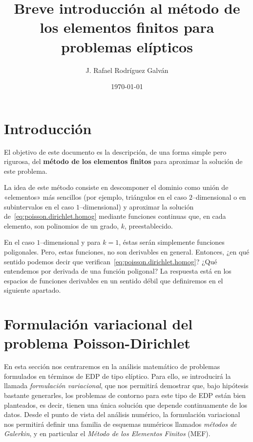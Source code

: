 \documentclass[11pt]{report}
\title{Breve introducción al método de los elementos finitos para problemas elípticos}
\author{J. Rafael Rodríguez Galván}
\date{\versiondate\today}
\theoremstyle{plain}
\theoremstyle{definition}
\begin{document}
\maketitle

\chapter{Introducción}

El objetivo de este documento es la descripción,  de una forma simple pero rigurosa, del \textbf{método de los elementos finitos} para aproximar la solución de este problema.

La idea de este método consiste en descomponer el dominio como unión de «elementos» más sencillos (por ejemplo, triángulos en el caso $2$--dimensional o en subintervalos en el caso $1$--dimensional) y aproximar la solución de~\eqref{eq:poisson.dirichlet.homog} mediante funciones continuas que, en cada elemento, son polinomios de un grado, $k$, preestablecido.

En el caso $1$--dimensional y para $k=1$, éstas serán simplemente funciones poligonales. Pero, estas funciones, no son derivables en general. Entonces, ¿en qué sentido podemos decir que verifican~\eqref{eq:poisson.dirichlet.homog}? ¿Qué entendemos por derivada de una función poligonal? La respuesta está en los espacios de funciones derivables en un sentido débil que definiremos en el siguiente apartado.


\chapter{Formulación variacional del problema Poisson-Dirichlet}

En esta sección nos centraremos en la análisis matemático de problemas formulados en términos de EDP de tipo elíptico. Para ello, se introducirá la llamada \emph{formulación variacional}, que nos permitirá demostrar que, bajo hipótesis bastante generarles, los problemas de contorno para este tipo de EDP están bien planteados, es decir, tienen una única solución que depende continuamente de los datos. Desde el punto de vista del análisis numérico, la formulación variacional nos permitirá definir una familia de esquemas numéricos llamados \emph{métodos de Galerkin}, y en particular el \emph{Método de los Elementos Finitos} (MEF).
\end{document}
